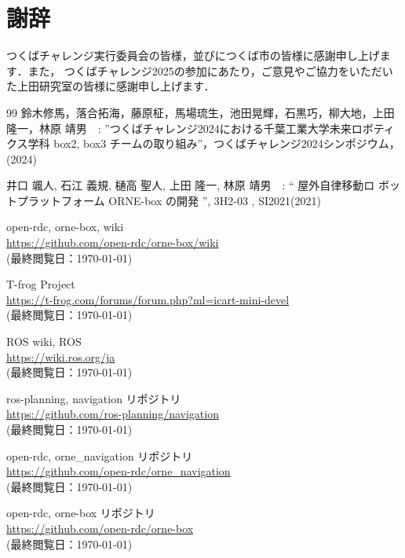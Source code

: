 \documentclass[uplatex, twocolumn, 9pt]{jsproceedings}
\begin{document}
\vspace*{12.3mm}


\section*{謝辞}
つくばチャレンジ実行委員会の皆様，並びにつくば市の皆様に感謝申し上げます．また，
つくばチャレンジ2025の参加にあたり，ご意見やご協力をいただいた上田研究室の皆様に感謝申し上げます．

\newpage


\footnotesize
\begin{thebibliography}{99}
鈴木修馬，落合拓海，藤原柾，馬場琉生，池田晃輝，石黒巧，柳大地，上田隆一，林原 靖男　: 
”つくばチャレンジ2024における千葉工業大学未来ロボティクス学科 box2, box3 チームの取り組み”，つくばチャレンジ2024シンポジウム，(2024)

井口 颯人, 石江 義規, 樋高 聖人, 上田 隆一, 林原 靖男　: “ 屋外自律移動ロ
ボットプラットフォーム ORNE-box の開発 ”, 3H2-03 , SI2021(2021)

open-rdc, orne-box, wiki\\
\url{https://github.com/open-rdc/orne-box/wiki}\\
(最終閲覧日：\today)

T-frog Project\\
\url{https://t-frog.com/forums/forum.php?ml=icart-mini-devel}\\
(最終閲覧日：\today)

ROS wiki, ROS\\
\url{https://wiki.ros.org/ja}\\
(最終閲覧日：\today)

ros-planning, navigation リポジトリ\\
\url{https://github.com/ros-planning/navigation}\\
(最終閲覧日：\today)

open-rdc, orne\_navigation リポジトリ\\
\url{https://github.com/open-rdc/orne_navigation}\\
(最終閲覧日：\today)

open-rdc, orne-box リポジトリ\\
\url{https://github.com/open-rdc/orne-box}\\
(最終閲覧日：\today)


\end{thebibliography}
\end{document}

